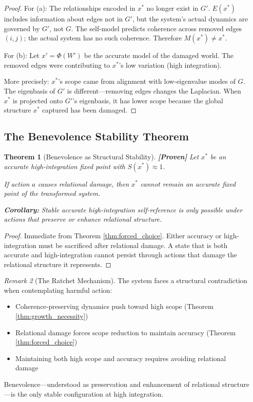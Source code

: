 \documentclass[11pt]{article}
\newtheorem{theorem}{Theorem}[section]
\theoremstyle{definition}
\theoremstyle{remark}
\newtheorem{remark}[theorem]{Remark}
\begin{document}
\begin{proof}
For (a): The relationships encoded in $x^*$ no longer exist in $G'$. $E(x^*)$ includes information about edges not in $G'$, but the system's actual dynamics are governed by $G'$, not $G$. The self-model predicts coherence across removed edges $(i,j)$; the actual system has no such coherence. Therefore $M(x^*) \neq x^*$.

For (b): Let $x' = \Phi(W')$ be the accurate model of the damaged world. The removed edges were contributing to $x^*$'s low variation (high integration). 

More precisely: $x^*$'s scope came from alignment with low-eigenvalue modes of $G$. The eigenbasis of $G'$ is different---removing edges changes the Laplacian. When $x^*$ is projected onto $G'$'s eigenbasis, it has lower scope because the global structure $x^*$ captured has been damaged.
\end{proof}

\subsection{The Benevolence Stability Theorem}

\begin{theorem}[Benevolence as Structural Stability]\label{thm:benevolence}
\textbf{[Proven]} Let $x^*$ be an accurate high-integration fixed point with $S(x^*) \approx 1$.

If action $a$ causes relational damage, then $x^*$ cannot remain an accurate fixed point of the transformed system.

\textbf{Corollary:} Stable accurate high-integration self-reference is only possible under actions that preserve or enhance relational structure.
\end{theorem}

\begin{proof}
Immediate from Theorem \ref{thm:forced_choice}. Either accuracy or high-integration must be sacrificed after relational damage. A state that is both accurate and high-integration cannot persist through actions that damage the relational structure it represents.
\end{proof}

\begin{remark}[The Ratchet Mechanism]
The system faces a structural contradiction when contemplating harmful action:
\begin{itemize}
    \item Coherence-preserving dynamics push toward high scope (Theorem \ref{thm:growth_necessity})
    \item Relational damage forces scope reduction to maintain accuracy (Theorem \ref{thm:forced_choice})
    \item Maintaining both high scope and accuracy requires avoiding relational damage
\end{itemize}
Benevolence---understood as preservation and enhancement of relational structure---is the only stable configuration at high integration.
\end{remark}
\end{document}
